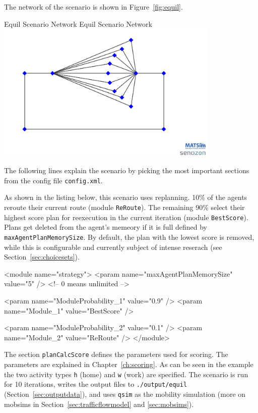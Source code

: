The network of the scenario is shown in Figure~\ref{fig:equil}.

\createfigure%
{Equil Scenario Network}%
{Equil Scenario Network}%
{\label{fig:equil}}%
{\includegraphics[width=0.8\textwidth, angle=0]{using/figures/equil.png}}%
{}

The following lines explain the scenario by picking the most important sections from the config file \lstinline|config.xml|.

As shown in the listing below, this scenario uses replanning. 10\% of the agents reroute their current route (module \lstinline|ReRoute|). The remaining 90\% select their highest score plan for reexecution in the current iteration (module \lstinline|BestScore|). Plans get deleted from the agent's memeory if it is full defined by \lstinline|maxAgentPlanMemorySize|. By default, the plan with the lowest score is removed, while this is configurable and currently subject of intense reserach (see Section~\ref{sec:choicesets}).
%
\begin{xml}
<module name="strategy">
	<param name="maxAgentPlanMemorySize" value="5" /> <!-- 0 means unlimited -->

	<param name="ModuleProbability_1" value="0.9" />
	<param name="Module_1" value="BestScore" />

	<param name="ModuleProbability_2" value="0.1" />
	<param name="Module_2" value="ReRoute" />
</module>
\end{xml}

The section \lstinline|planCalcScore| defines the parameters used for scoring. The parameters are explained in Chapter~\ref{ch:scoring}. As can be seen in the example the two activity types \lstinline|h| (home) and \lstinline|w| (work) are specified. The scenario is run for 10 iterations, writes the output files to \lstinline|./output/equil| (Section~\ref{sec:outputdata}), and uses \lstinline|qsim| as the mobility simulation (more on \gls{mobsim}s in Section~\ref{sec:trafficflowmodel} and \ref{sec:mobsims}).

